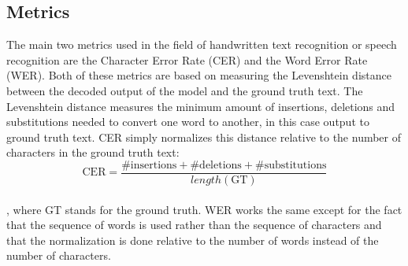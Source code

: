 \documentclass{article}
\begin{document}
\subsection{Metrics}
The main two metrics used in the field of handwritten text recognition or speech recognition are the Character Error Rate (CER) and the Word Error Rate (WER). Both of these metrics are based on measuring the Levenshtein distance between the decoded output of the model and the ground truth text. The Levenshtein distance measures the minimum amount of insertions, deletions and substitutions needed to convert one word to another, in this case output to ground truth text. CER simply normalizes this distance relative to the number of characters in the ground truth text:\\
\[
\text{CER} = \frac{\text{\#insertions}+\text{\#deletions}+\text{\#substitutions}}{length(\text{GT})}
\]\\ 
, where GT stands for the ground truth. WER works the same except for the fact that the sequence of words is used rather than the sequence of characters and that the normalization is done relative to the number of words instead of the number of characters.
\end{document}
